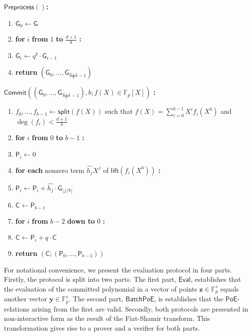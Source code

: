 \documentclass[11pt]{article}
\theoremstyle{Definition}
\begin{document}
\begin{mdframed}
$\mathsf{Preprocess}()$\textbf{:}
\begin{enumerate}[nolistsep]
	\item $\mathsf{G}_0 \gets \mathsf{G}$
	\item \textbf{for} $i$ \textbf{from} $1$ \textbf{to} $\frac{d+1}{b}$ \textbf{:}
	\item \pcind $\mathsf{G}_i \gets q^{b} \cdot \mathsf{G}_{i-1}$
	\item \textbf{return} $\left(\mathsf{G}_0, \ldots, \mathsf{G}_{\frac{d+1}{b} - 1}\right)$
\end{enumerate}
$\mathsf{Commit}(\left(\mathsf{G}_0, \ldots, \mathsf{G}_{\frac{d+1}{b} - 1}\right), b; f(X) \in \mathbb{F}_p[X])$ \textbf{:}
\begin{enumerate}[nolistsep]
	\item $f_0, \ldots, f_{b-1} \gets \mathsf{split}(f(X))$ such that $f(X) = \sum_{i=0}^{b-1} X^i f_i(X^b)$ and $\deg(f_i) < \frac{d+1}{b}$
	\item \textbf{for} $i$ \textbf{from} $0$ \textbf{to} $b-1$ \textbf{:}
	\item $\mathsf{P}_i \gets 0$
	\item \pcind \textbf{for each} nonzero term $\hat{h_j} X^{j}$ of $\mathsf{lift}(f_i(X^b))$ \textbf{:}
	\item \pcind \pcind $\mathsf{P}_i \gets \mathsf{P}_i + \hat{h_j} \cdot \mathsf{G}_{\lfloor j / b \rfloor}$ \label{line:commit-coefficient}
	\item $\mathsf{C} \gets \mathsf{P}_{b-1}$
	\item \textbf{for} $i$ \textbf{from} $b-2$ \textbf{down to} $0$ \textbf{:}
	\item \pcind $\mathsf{C} \gets \mathsf{P}_{i} + q \cdot \mathsf{C}$ \label{line:commit-shift}
	\item \textbf{return} $(\mathsf{C}; \left(\mathsf{P}_0, \ldots, \mathsf{P}_{b-1}\right))$
\end{enumerate}
\end{mdframed}

For notational convenience, we present the evaluation protocol in four parts. Firstly, the protocol is split into two parts. The first part, $\mathsf{Eval}$, establishes that the evaluation of the committed polynomial in a vector of points $\mathbf{z} \in \mathbb{F}_p^s$ equals another vector $\mathbf{y} \in \mathbb{F}_p^s$. The second part, $\mathsf{BatchPoE}$, is establishes that the $\mathsf{PoE}$-relations arising from the first are valid. Secondly, both protocols are presented in non-interactive form as the result of the Fiat-Shamir transform. This transformation gives rise to a prover and a verifier for both parts.
\end{document}
